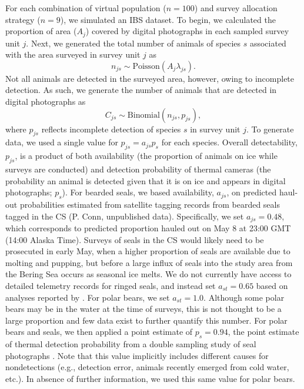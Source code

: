 \documentclass[]{rsos}%
\begin{document}
For each combination of virtual population ($n=100$) and survey allocation strategy ($n=9$), we simulated an IBS dataset.  To begin, we calculated the proportion of area ($A_j$) covered by digital photographs in each sampled survey unit $j$.  Next, we generated the total number of animals of species $s$ associated with the area surveyed in survey unit $j$ as
\begin{equation*}
  n_{js} \sim \text{Poisson} (A_j \lambda_{js}).
\end{equation*}
Not all animals are detected in the surveyed area, however, owing to incomplete detection.  As such, we generate the number of animals that are detected in digital photographs as
\begin{equation*}
  C_{js} \sim \text{Binomial} (n_{js},p_{js}),
\end{equation*}
where $p_{js}$ reflects incomplete detection of species $s$ in survey unit $j$. To generate data, we used a single value for $p_{js} = a_{js}p_s$ for each species.  Overall detectability, $p_{js}$, is a product of both availability (the proportion of animals on ice while surveys are conducted) and detection probability of thermal cameras (the probability an animal is detected given that it is on ice and appears in digital photographs; $p_s$).  For bearded seals, we based availability, $a_{js}$, on predicted haul-out probabilities estimated from satellite tagging records from bearded seals tagged in the CS (P. Conn, unpublished data).  Specifically, we set $a_{js}=0.48$, which corresponds to predicted proportion hauled out on May 8 at 23:00 GMT (14:00 Alaska Time).  Surveys of seals in the CS would likely need to be prosecuted in early May, when a higher proportion of seals are available due to molting and pupping, but before a large influx of seals into the study area from the Bering Sea occurs as seasonal ice melts. We do not currently have access to detailed telemetry records for ringed seals, and instead set $a_{st}=0.65$ based on analyses reported by \cite{Bengtson2005}.  For polar bears, we set $a_{st}=1.0$.  Although some polar bears may be in the water at the time of surveys, this is not thought to be a large proportion and few data exist to further quantify this number.  For polar bears and seals, we then applied a point estimate of $p_s=0.94$, the point estimate of thermal detection probability from a double sampling study of seal photographs \cite{ConnEtAl2014}.  Note that this value implicitly includes different causes for nondetections (e.g., detection error, animals recently emerged from cold water, etc.).  In absence of further information, we used this same value for polar bears.
\end{document}
